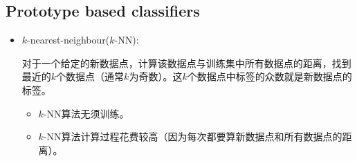 \documentclass[12pt, a4paper, oneside]{ctexart}
\begin{document}
\subsection{Prototype based classifiers}
\begin{itemize}
    \item $k$-nearest-neighbour($k$-NN):
    
    对于一个给定的新数据点，计算该数据点与训练集中所有数据点的距离，找到最近的$k$个数据点（通常$k$为奇数）。这$k$个数据点中标签的众数就是新数据点的标签。
    \begin{itemize}
        \item $k$-NN算法无须训练。
        \item $k$-NN算法计算过程花费较高（因为每次都要算新数据点和所有数据点的距离）。
    \end{itemize}
\end{itemize}
\end{document}
